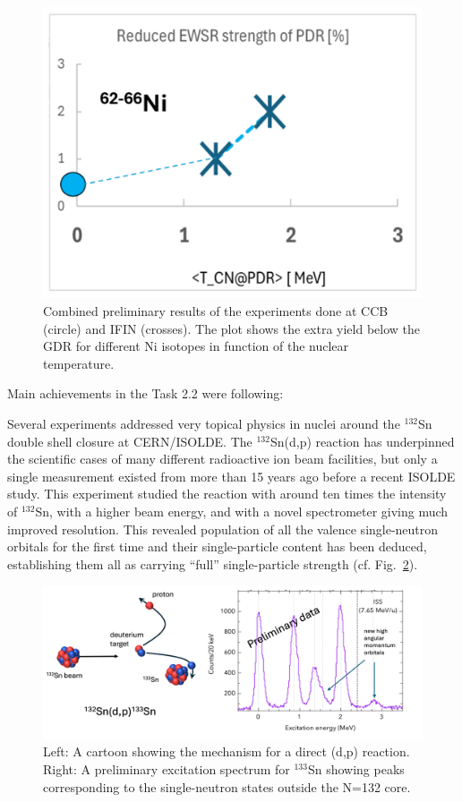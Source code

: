 \begin{figure}[!h]
    \centering
    \includegraphics[width=0.6\linewidth]{graphics/Wieland.png}
    \caption{Combined preliminary results of the experiments done at CCB (circle) and IFIN (crosses). The plot shows the extra yield below the GDR for different Ni isotopes in function of the nuclear temperature.
}
    \label{fig:Wieland}
\end{figure}

Main achievements in the Task 2.2 were following:

Several experiments addressed very topical physics in nuclei around the $^{132}$Sn double shell closure at CERN/ISOLDE. The $^{132}$Sn(d,p) reaction has underpinned the scientific cases of many different radioactive ion beam facilities, but only a single measurement existed from more than 15 years ago before a recent ISOLDE study. This experiment studied the reaction with around ten times the intensity of $^{132}$Sn, with a higher beam energy, and with a novel spectrometer giving much improved resolution. This revealed population of all the valence single-neutron orbitals for the first time and their single-particle content has been deduced, establishing them all as carrying “full” single-particle strength (cf. Fig.~\ref{fig:ISOLDE_Highlight_1}). 

\begin{figure}[!h]
    \centering
    \includegraphics[width=0.9\linewidth]{graphics/ISOLDE_highlight_1.png}
    \caption{Left: A cartoon showing the mechanism for a direct (d,p) reaction.
Right: A preliminary excitation spectrum for $^{133}$Sn showing peaks corresponding to the single-neutron states outside the N=132 core.
}
    \label{fig:ISOLDE_Highlight_1}
\end{figure}

